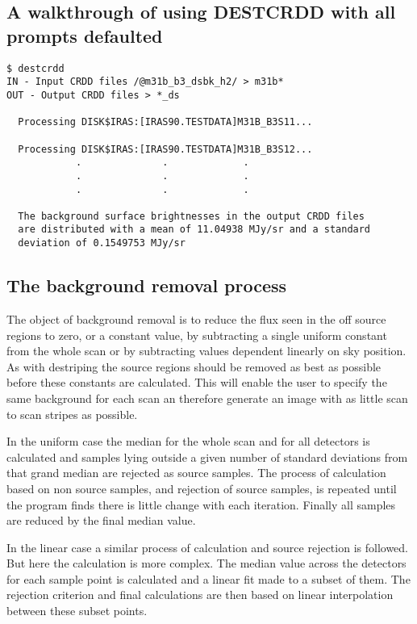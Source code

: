\documentclass[twoside,11pt]{article}
\begin{document}
\subsection{A walkthrough of using DESTCRDD with all prompts defaulted}
\begin{small}
\begin{verbatim}
$ destcrdd 
IN - Input CRDD files /@m31b_b3_dsbk_h2/ > m31b*
OUT - Output CRDD files > *_ds

  Processing DISK$IRAS:[IRAS90.TESTDATA]M31B_B3S11...

  Processing DISK$IRAS:[IRAS90.TESTDATA]M31B_B3S12...
            .              .             .
            .              .             .
            .              .             .

  The background surface brightnesses in the output CRDD files
  are distributed with a mean of 11.04938 MJy/sr and a standard
  deviation of 0.1549753 MJy/sr
\end{verbatim}
\end{small}
\subsection{The background removal process}
The object of background removal is to reduce the flux seen in the off source
regions to zero, or a constant value, by subtracting a single uniform constant 
from the whole scan or by subtracting values dependent linearly on sky 
position. As with destriping the source regions should be removed as best as 
possible before these constants are calculated. This will enable the user to
specify the same background for each scan an therefore generate an image with
as little scan to scan stripes as possible.

In the uniform case the median for the whole scan and for all detectors is
calculated and samples lying outside a given number of standard deviations 
from that grand median are rejected as source samples. The process of 
calculation based on non source samples, and rejection of source samples,
is repeated until the program finds there is little change with each iteration.
Finally all samples are reduced by the final median value.

In the linear case a similar process of calculation and source rejection 
is followed. But here the calculation is more complex. The median value across
the detectors for each sample  point is calculated and a linear fit made to
a subset of them. The rejection criterion and final calculations are then based 
on linear interpolation between these subset points.
\end{document}
